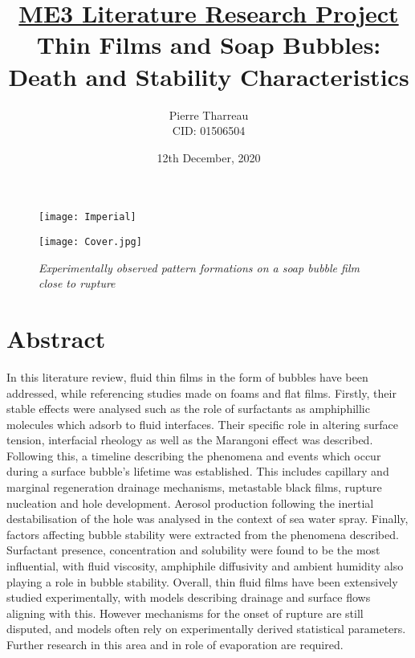 \documentclass[a4paper,12pt]{article}
\numberwithin{equation}{section}
\numberwithin{figure}{section}
\numberwithin{table}{section}
\begin{document}
\begin{figure} [t]
    \texttt{[image: Imperial]}
\end{figure}



\title{\large \underline{ME3 Literature Research Project} \\ \huge Thin Films and Soap Bubbles: Death and Stability Characteristics}

\date{12th December, 2020}
\author{Pierre Tharreau \\ CID: 01506504}
\maketitle

\begin{figure} [h]
    \centering
    \captionsetup{width=.9\linewidth}
    \texttt{[image: Cover.jpg]}
    \caption*{\textit{Experimentally observed pattern formations on a soap bubble film close to rupture \cite{Shen2020}}}
\end{figure}


\newpage
{}

\section*{Abstract}
In this literature review, fluid thin films in the form of bubbles have been addressed, while referencing studies made on foams and flat films. Firstly, their stable effects were analysed such as the role of surfactants as amphiphillic molecules which adsorb to fluid interfaces. Their specific role in altering surface tension, interfacial rheology as well as the Marangoni effect was described. Following this, a timeline describing the phenomena and events which occur during a surface bubble's lifetime was established. This includes capillary and marginal regeneration drainage mechanisms, metastable black films, rupture nucleation and hole development. Aerosol production following the inertial destabilisation of the hole was analysed in the context of sea water spray. Finally, factors affecting bubble stability were extracted from the phenomena described. Surfactant presence, concentration and solubility  were found to be the most influential, with fluid viscosity, amphiphile diffusivity and ambient humidity also playing a role in bubble stability. Overall, thin fluid films have been extensively studied experimentally, with models describing drainage and surface flows aligning with this. However mechanisms for the onset of rupture are still disputed, and models often rely on experimentally derived statistical parameters. Further research in this area and in role of evaporation are required.
\end{document}
